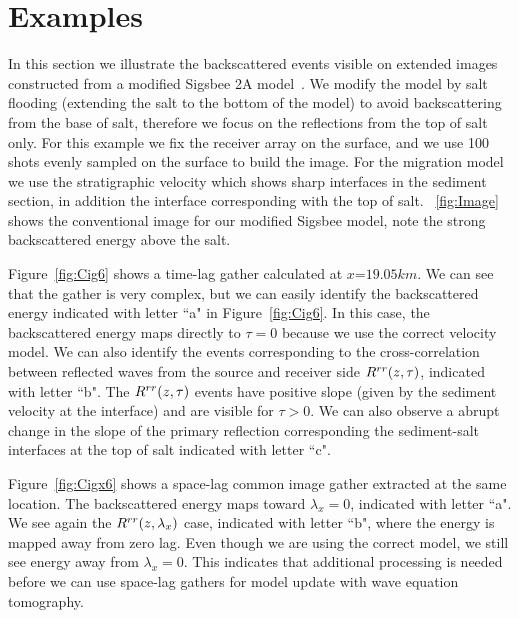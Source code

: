 

\section{Examples}

In this section we illustrate the backscattered events visible on extended images constructed from a modified Sigsbee 2A model~\citep{Sigsbee}. 
We modify the model by salt flooding (extending the salt to the bottom
of the model) to avoid backscattering from the base 
of salt, therefore we focus on the reflections from the top of salt only. For this example we fix the receiver array on 
the surface, and we use 100 shots evenly sampled on the surface to build 
the image. For the migration model we use the stratigraphic
velocity which shows sharp interfaces in the sediment section, in addition the interface corresponding with the top of salt. 
~\ref{fig:Image} shows the conventional image for our modified Sigsbee model, note the strong backscattered
energy above the salt.

Figure~\ref{fig:Cig6} shows a time-lag gather calculated at $x$=$19.05km$.
We can see that the gather is very complex, but we can easily identify the backscattered energy indicated with letter ``a" in Figure~\ref{fig:Cig6}.
 In this case, the backscattered energy maps directly to $\tau=0$ because we use the correct velocity model.
We can also identify the events corresponding to the cross-correlation between reflected waves from the source and receiver side $R^{rr}(z,\tau)$, indicated
with letter ``b". The $R^{rr}(z,\tau)$ events have positive slope (given by the sediment velocity at the interface) and are 
visible for $\tau>0$. We can also observe a abrupt change
in the slope of the primary reflection corresponding the sediment-salt interfaces at the top of salt indicated with letter ``c".

Figure~\ref{fig:Cigx6} shows a space-lag common image gather extracted at the same location. The backscattered energy maps toward $\lambda_x=0$, indicated with 
letter ``a". We see again the $R^{rr}(z,\lambda_x)$ case, indicated with letter ``b", where the energy is mapped away from zero lag.  
Even though we are using the correct model, we still see energy away from $\lambda_x=0$. This indicates that additional processing is needed before 
we can use space-lag gathers for model update with wave equation tomography.


